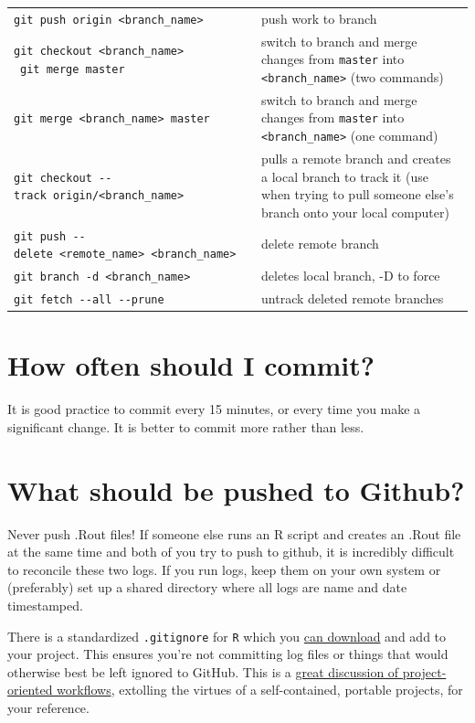 \documentclass[
]{book}
\begin{document}
\begin{longtable}[]{@{}
  >{\raggedright\arraybackslash}p{}
  >{\raggedright\arraybackslash}p{}@{}}
\texttt{git\ push\ origin\ \textless{}branch\_name\textgreater{}} & push work to branch \\
\texttt{git\ checkout\ \textless{}branch\_name\textgreater{}} ~\texttt{git\ merge\ master} & switch to branch and merge changes from \texttt{master} into \texttt{\textless{}branch\_name\textgreater{}} (two commands) \\
\texttt{git\ merge\ \textless{}branch\_name\textgreater{}\ master} & switch to branch and merge changes from \texttt{master} into \texttt{\textless{}branch\_name\textgreater{}} (one command) \\
\texttt{git\ checkout\ -\/-track\ origin/\textless{}branch\_name\textgreater{}} & pulls a remote branch and creates a local branch to track it (use when trying to pull someone else's branch onto your local computer) \\
\texttt{git\ push\ -\/-delete\ \textless{}remote\_name\textgreater{}\ \textless{}branch\_name\textgreater{}} & delete remote branch \\
\texttt{git\ branch\ -d\ \textless{}branch\_name\textgreater{}} & deletes local branch, -D to force \\
\texttt{git\ fetch\ -\/-all\ -\/-prune} & untrack deleted remote branches \\
\end{longtable}

\section{How often should I commit?}\label{how-often-should-i-commit}

It is good practice to commit every 15 minutes, or every time you make a significant change. It is better to commit more rather than less.

\section{What should be pushed to Github?}\label{what-should-be-pushed-to-github}

Never push .Rout files! If someone else runs an R script and creates an .Rout file at the same time and both of you try to push to github, it is incredibly difficult to reconcile these two logs. If you run logs, keep them on your own system or (preferably) set up a shared directory where all logs are name and date timestamped.

There is a standardized \texttt{.gitignore} for \texttt{R} which you \href{https://github.com/github/gitignore/blob/master/R.gitignore}{can download} and add to your project. This ensures you're not committing log files or things that would otherwise best be left ignored to GitHub. This is a \href{https://www.tidyverse.org/articles/2017/12/workflow-vs-script/}{great discussion of project-oriented workflows}, extolling the virtues of a self-contained, portable projects, for your reference.
\end{document}
